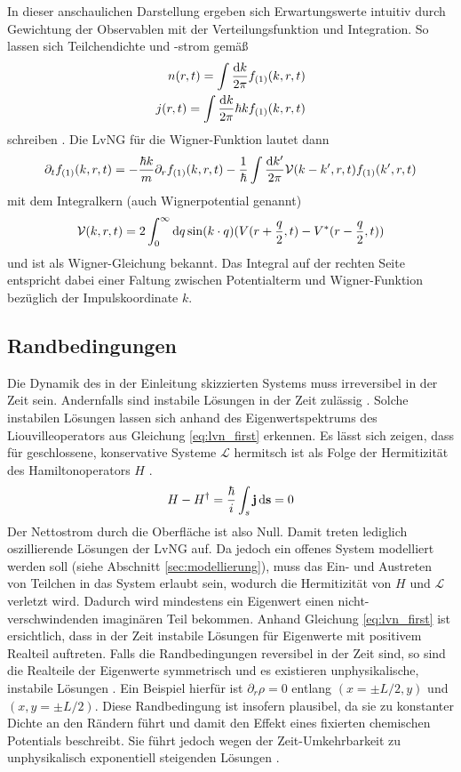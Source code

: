 In dieser anschaulichen Darstellung ergeben sich Erwartungswerte intuitiv durch Gewichtung der Observablen mit der Verteilungsfunktion und Integration. So lassen sich Teilchendichte und -strom gemäß
\begin{align}
  n(r,t) = \int \frac{\mathop{}\!\mathrm{d} k}{2\pi}f_{(1)}(k,r,t) \label{eq:wigner_n}\\
  j(r,t) = \int \frac{\mathop{}\!\mathrm{d} k}{2\pi}\hbar k f_{(1)}(k,r,t)
\end{align}
schreiben \cite{modern}. Die LvNG für die Wigner-Funktion lautet dann \cite{frensley2, failure}
\begin{equation}
  \partial_t f_{(1)}(k,r,t) = -\frac{\hbar k}{m}\partial_r f_{(1)}(k,r,t) - \frac{1}{\hbar} \int \frac{\mathop{}\!\mathrm{d} k'}{2\pi}\mathcal{V}(k-k',r,t)f_{(1)}(k',r,t)
  \label{eq:wigner}
\end{equation}
mit dem Integralkern (auch Wignerpotential genannt)
\begin{equation*}
  \mathcal{V}(k,r,t) = 2\int_0^{\infty} \mathop{}\!\mathrm{d} q \sin(k\cdot q) (V(r+\frac{q}{2},t) - V^*(r-\frac{q}{2},t))
\end{equation*}
und ist als Wigner-Gleichung bekannt. Das Integral auf der rechten Seite entspricht dabei einer Faltung zwischen Potentialterm und Wigner-Funktion bezüglich der Impulskoordinate $k$.



\subsection{Randbedingungen}
\label{sec:RB}
Die Dynamik des in der Einleitung skizzierten Systems muss irreversibel in der Zeit sein. Andernfalls sind instabile Lösungen in der Zeit zulässig \cite{frensley2}. Solche instabilen Lösungen lassen sich anhand des Eigenwertspektrums des Liouvilleoperators aus Gleichung \eqref{eq:lvn_first} erkennen. Es lässt sich zeigen, dass für geschlossene, konservative Systeme $\mathcal{L}$ hermitsch ist als Folge der Hermitizität des Hamiltonoperators $H$ \cite{frensley2}.
\begin{align}
  H- H^{\dagger} = \frac{\hbar}{i}\int_s \vb{j}\mathop{}\!\mathrm{d}\vb{s} = 0
\end{align}
Der Nettostrom durch die Oberfläche ist also Null. Damit treten lediglich oszillierende Lösungen der LvNG auf. Da jedoch ein offenes System modelliert werden soll (siehe Abschnitt \ref{sec:modellierung}), muss das Ein- und Austreten von Teilchen in das System erlaubt sein, wodurch die Hermitizität von $H$ und $\mathcal{L}$ verletzt wird. Dadurch wird mindestens ein Eigenwert einen nicht-verschwindenden imaginären Teil bekommen. Anhand Gleichung \eqref{eq:lvn_first} ist ersichtlich, dass in der Zeit instabile Lösungen für Eigenwerte mit positivem Realteil auftreten. Falls die Randbedingungen reversibel in der Zeit sind, so sind die Realteile der Eigenwerte symmetrisch und es existieren unphysikalische, instabile Lösungen \cite{frensley2}. Ein Beispiel hierfür ist $\partial_r \rho = 0$ entlang $(x=\pm L/2, y)$ und $(x,y=\pm L/2)$. Diese Randbedingung ist insofern plausibel, da sie zu konstanter Dichte an den Rändern führt und damit den Effekt eines fixierten chemischen Potentials beschreibt. Sie führt jedoch wegen der Zeit-Umkehrbarkeit zu unphysikalisch exponentiell steigenden Lösungen \cite{frensley2}.

